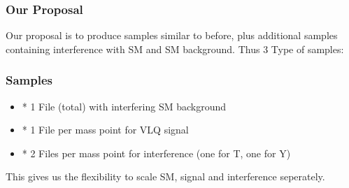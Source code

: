 \documentclass{beamer}
\begin{document}
\begin{frame}
\frametitle{Our Proposal}
Our proposal is to produce samples similar to before, plus additional samples containing interference with SM and SM background. 
\linebreak
\linebreak
Thus 3 Type of samples:
\end{frame}



\begin{frame}
\frametitle{Samples}
\begin{itemize}[topsep=1cm]


\item{*} 1 File (total) with interfering SM background
\item{*} 1 File per mass point for VLQ signal
\item{*} 2 Files per mass point for interference (one for T, one for Y)
\end{itemize}

This gives us the flexibility to scale SM, signal and interference seperately.
\end{frame}

\end{document}
